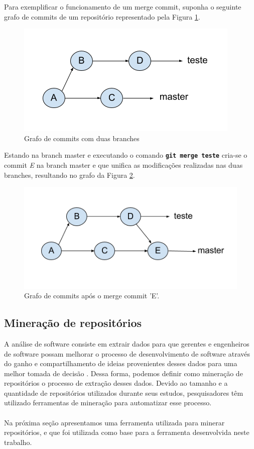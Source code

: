 \documentclass[a4paper,12pt]{article}
\begin{document}
Para exemplificar o funcionamento de um merge commit, suponha o seguinte grafo de commits de um repositório representado pela Figura \ref{fig:graphBefore}.

 \begin{figure}[h]
 \centering
 \includegraphics[width=0.65\linewidth]{imgs/graph_before.png}
 \caption{Grafo de commits com duas branches}
 \label{fig:graphBefore}
 \end{figure}



Estando na branch master e executando o comando {\small\texttt{\textbf{git merge teste}}} cria-se o commit \textit{E} na branch master e que unifica as modificações realizadas nas duas branches, resultando no grafo da Figura \ref{fig:graphAfter}.

 \begin{figure}[H]
 \centering
 \includegraphics[width=0.65\linewidth]{imgs/graph_after.png}
 \caption{Grafo de commits após o merge commit 'E'.}
 \label{fig:graphAfter}
 \end{figure}


\subsection{Mineração de repositórios}%
\label{sec:mining}



A análise de software consiste em extrair dados para que gerentes e engenheiros de software possam melhorar o processo de desenvolvimento de software através do ganho e compartilhamento de ideias provenientes desses dados para uma melhor tomada de decisão \cite{soWhat}. Dessa forma, podemos definir como mineração de repositórios o processo de  extração desses dados. Devido ao tamanho e a quantidade de repositórios utilizados durante seus estudos, pesquisadores têm utilizado ferramentas de mineração para automatizar esse processo. %
\\
\\
Na próxima seção apresentamos uma ferramenta utilizada para minerar repositórios, e que foi utilizada como base para a ferramenta desenvolvida neste trabalho.
\end{document}
